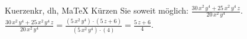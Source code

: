\begin{MAufgabe}{Kuerzen}{kr, dh, MaTeX}
K\"urzen Sie soweit m\"oglich: $\frac{30\, x^2\, y^4 + 25\, x^2\, y^4\, z}{20\, x^2\, y^4}$.\\ 
\ifLsg\MLoesung
\quad $\frac{30\, x^2\, y^4 + 25\, x^2\, y^4\, z}{20\, x^2\, y^4}=\frac{(5\, x^2\, y^4)\cdot(5\, z + 6)}{(5\, x^2\, y^4)\cdot(4)}=\frac{5\, z + 6}{4}$.\else\relax\fi
 \end{MAufgabe}
